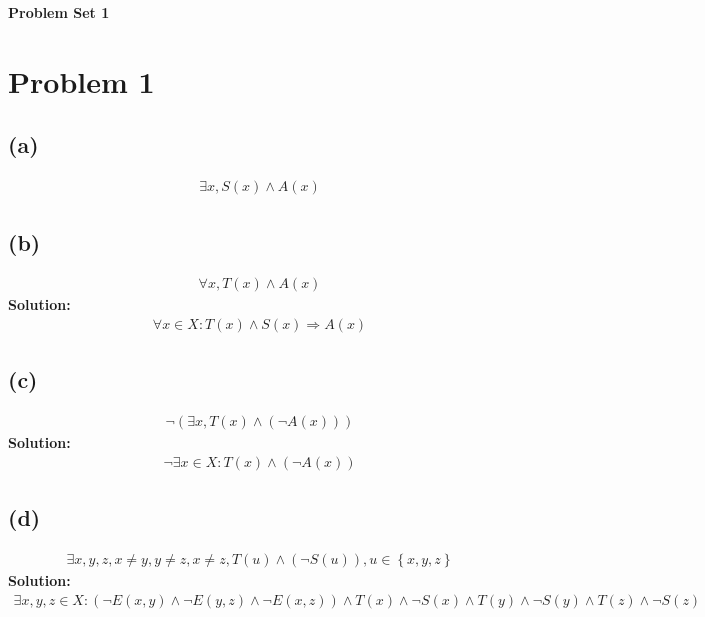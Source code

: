 \documentclass[12pt]{article}
\begin{document}
    \begin{center}
        \Large \textbf{Problem Set 1}
    \end{center}
\section*{Problem 1}
\subsection*{(a)}
\begin{align*}
    \exists x, S(x)\land A(x)
\end{align*}

\subsection*{(b)}
\begin{align*}
    \forall x, T(x)\land A(x)
\end{align*}
{\color{red}\textbf{Solution: }
\begin{align*}
    \forall x\in X: T(x) \land S(x) \Rightarrow A(x)
\end{align*}
}

\subsection*{(c)}
\begin{align*}
    \neg \left( \exists x, T(x)\land \left( \neg A(x) \right)  \right) 
\end{align*}
{\color{blue}\textbf{Solution: }
\begin{align*}
    \neg\exists x\in X: T(x)\land \left( \neg A(x) \right) 
\end{align*}
}

\subsection*{(d)}
\begin{align*}
    \exists x, y, z, x \neq y, y \neq z, x \neq z, T(u)\land \left( \neg S(u) \right), u\in \left\{x, y, z \right\} 
\end{align*}
{\color{blue}\textbf{Solution: }
\begin{align*}
    \exists x, y, z\in X: \left(\neg E(x, y)\land \neg E(y, z) \land\neg E(x, z) \right) \land T(x) \land \neg S(x) \land T(y) \land \neg S(y) \land T(z) \land \neg S(z)
\end{align*}
}
\end{document}

